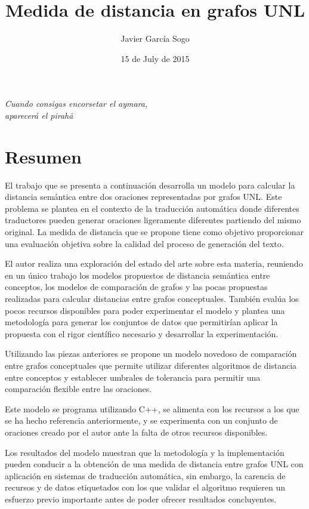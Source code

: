 \documentclass[a4paper,12pt,spanish]{book}
\title{Medida de distancia en grafos UNL}
\date{15 de July de 2015}
\author{Javier García Sogo}
\begin{document}
\maketitle


\cleardoublepage
\chapter*{}
\begin{flushright}
\textit{Cuando consigas encorsetar el aymara,\\ aparecerá el pirahã}
\end{flushright}\cleardoublepage
\chapter*{Resumen}
El trabajo que se presenta a continuación desarrolla un modelo para calcular la distancia
semántica entre dos oraciones representadas por grafos UNL. Este problema se plantea
en el contexto de la traducción automática donde diferentes traductores pueden generar
oraciones ligeramente diferentes partiendo del mismo original. La medida de distancia que
se propone tiene como objetivo proporcionar una evaluación objetiva sobre la calidad del
proceso de generación del texto.

El autor realiza una exploración del estado del arte sobre esta materia, reuniendo en un
único trabajo los modelos propuestos de distancia semántica entre conceptos, los modelos de
comparación de grafos y las pocas propuestas realizadas para calcular distancias entre
grafos conceptuales. También evalúa los pocos recursos disponibles para poder experimentar
el modelo y plantea una metodología para generar los conjuntos de datos que permitirían
aplicar la propuesta con el rigor científico necesario y desarrollar la experimentación.

Utilizando las piezas anteriores se propone un modelo novedoso de comparación entre grafos
conceptuales que permite utilizar diferentes algoritmos de distancia entre conceptos y
establecer umbrales de tolerancia para permitir una comparación flexible entre las oraciones.

Este modelo se programa utilizando C++, se alimenta con los recursos a los que se ha
hecho referencia anteriormente, y se experimenta con un conjunto de oraciones creado por el
autor ante la falta de otros recursos disponibles.

Los resultados del modelo muestran que la metodología y la implementación pueden conducir a
la obtención de una medida de distancia entre grafos UNL con aplicación en sistemas de
traducción automática, sin embargo, la carencia de recursos y de datos etiquetados con
los que validar el algoritmo requieren un esfuerzo previo importante antes de poder ofrecer
resultados concluyentes.
\cleardoublepage
\end{document}

